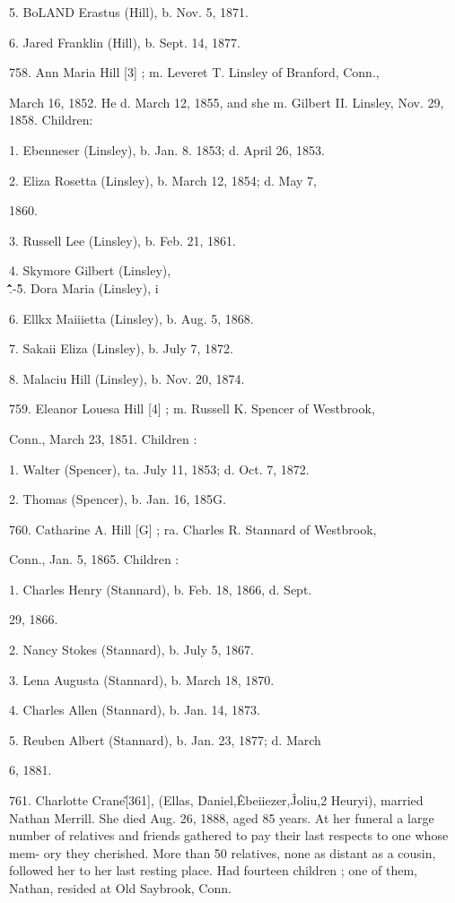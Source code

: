 5. BoLAND Erastus (Hill), b. Nov. 5, 1871. 

6. Jared Franklin (Hill), b. Sept. 14, 1877. 

758. Ann Maria Hill [3] ; m. Leveret T. Linsley of Branford, Conn., 

March 16, 1852. He d. March 12, 1855, and she m. Gilbert II. 
Linsley, Nov. 29, 1858. Children: 

1. Ebenneser (Linsley), b. Jan. 8. 1853; d. April 26, 1853. 

2. Eliza Rosetta (Linsley), b. March 12, 1854; d. May 7, 

1860. 

3. Russell Lee (Linsley), b. Feb. 21, 1861. 

4. Skymore Gilbert (Linsley), \\ \^ \^ \^\^ \^\^\^.-\^ 

5. Dora Maria (Linsley), i 

6. Ellkx Maiiietta (Linsley), b. Aug. 5, 1868. 

7. Sakaii Eliza (Linsley), b. July 7, 1872. 

8. Malaciu Hill (Linsley), b. Nov. 20, 1874. 




759. Eleanor Louesa Hill [4] ; m. Russell K. Spencer of Westbrook, 

Conn., March 23, 1851. Children : 

1. Walter (Spencer), ta. July 11, 1853; d. Oct. 7, 1872. 

2. Thomas (Spencer), b. Jan. 16, 185G. 

760. Catharine A. Hill [G] ; ra. Charles R. Stannard of Westbrook, 

Conn., Jan. 5, 1865. Children : 

1. Charles Henry (Stannard), b. Feb. 18, 1866, d. Sept. 

29, 1866. 

2. Nancy Stokes (Stannard), b. July 5, 1867. 

3. Lena Augusta (Stannard), b. March 18, 1870. 

4. Charles Allen (Stannard), b. Jan. 14, 1873. 

5. Reuben Albert (Stannard), b. Jan. 23, 1877; d. March 

6, 1881. 

761. Charlotte Crane\^ [361], (Ellas, \^ Daniel,\^ Ebeiiezer,\^ 
Joliu,2 Heuryi), married Nathan Merrill. She died Aug. 26, 
1888, aged 85 years. At her funeral a large number of relatives 
and friends gathered to pay their last respects to one whose mem- 
ory they cherished. More than 50 relatives, none as distant as 
a cousin, followed her to her last resting place. Had fourteen 
children ; one of them, Nathan, resided at Old Saybrook, Conn. 

